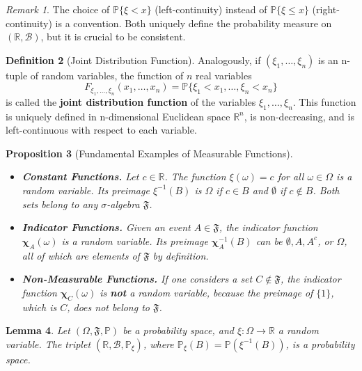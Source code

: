 \documentclass[12pt, openany]{book}
\theoremstyle{definition}
\newtheorem{definition}{Definition}[section]
\theoremstyle{plain}
\newtheorem{proposition}[definition]{Proposition}
\newtheorem{lemma}[definition]{Lemma}
\theoremstyle{remark}
\newtheorem{remark}[definition]{Remark}
\newcommand{\R}{\mathbb{R}}
\newcommand{\B}{\mathcal{B}}
\newcommand{\probP}{\mathbb{P}}
\newcommand{\germF}{\mathfrak{F}} %
\begin{document}
\begin{remark}
The choice of $\probP\{\xi < x\}$ (left-continuity) instead of $\probP\{\xi \le x\}$ (right-continuity) is a convention. Both uniquely define the probability measure on $(\R, \B)$, but it is crucial to be consistent.
\end{remark}

\begin{definition}[Joint Distribution Function]
Analogously, if $(\xi_1, \dots, \xi_n)$ is an n-tuple of random variables, the function of $n$ real variables
$$ F_{\xi_1, \dots, \xi_n}(x_1, \dots, x_n) = \probP\{\xi_1 < x_1, \dots, \xi_n < x_n \} $$
is called the \textbf{joint distribution function} of the variables $\xi_1, \dots, \xi_n$. This function is uniquely defined in n-dimensional Euclidean space $\R^n$, is non-decreasing, and is left-continuous with respect to each variable.
\end{definition}

\begin{proposition}[Fundamental Examples of Measurable Functions] \\
\begin{itemize}
\textit{ }
    \item \textbf{Constant Functions.} Let $c \in \R$. The function $\xi(\omega) = c$ for all $\omega \in \Omega$ is a random variable. Its preimage $ \xi^{-1}(B) $ is $\Omega$ if $c \in B$ and $\emptyset$ if $c \notin B$. Both sets belong to any $\sigma$-algebra $\germF$.
    \item \textbf{Indicator Functions.} Given an event $A \in \germF$, the indicator function $\mathbf{\chi}_A(\omega)$ is a random variable. Its preimage $\mathbf{\chi}_A^{-1}(B)$ can be $\emptyset, A, A^c$, or $\Omega$, all of which are elements of $\germF$ by definition.
    \item \textbf{Non-Measurable Functions.} If one considers a set $C \notin \germF$, the indicator function $\mathbf{\chi}_C(\omega)$ is \textbf{not} a random variable, because the preimage of $\{1\}$, which is $C$, does not belong to $\germF$.
\end{itemize}
\end{proposition}

\begin{lemma}
Let $(\Omega, \germF, \probP)$ be a probability space, and $\xi: \Omega \to \R$ a random variable. The triplet $(\R, \B, \probP_\xi)$, where $\probP_\xi(B) = \probP(\xi^{-1}(B))$, is a probability space.
\end{lemma}
\end{document}
